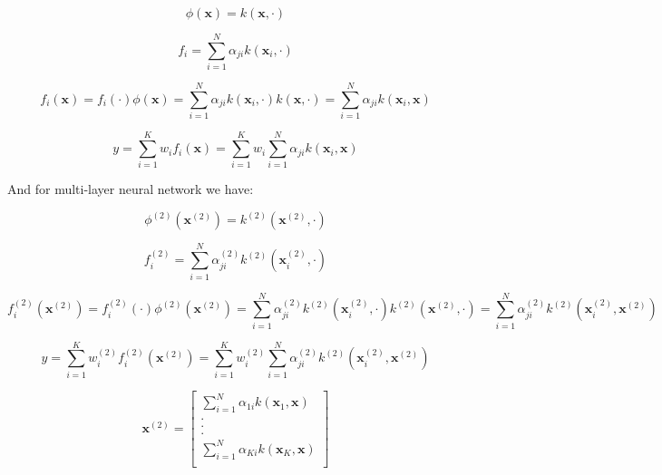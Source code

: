\documentclass{article}
\begin{document}
\begin{equation}
\phi(\mathbf{x}) = k(\mathbf{x},\cdot)
\end{equation}

\begin{equation}
f_i = \sum\limits_{i=1}^N \alpha_{ji} k(\mathbf{x}_i,\cdot)
\end{equation}

\begin{equation}
f_i(\mathbf{x}) = f_i(\cdot)\phi(\mathbf{x}) = \sum\limits_{i=1}^N \alpha_{ji} k(\mathbf{x}_i,\cdot) k(\mathbf{x}, \cdot) = \sum\limits_{i=1}^N \alpha_{ji} k(\mathbf{x}_i,\mathbf{x})
\end{equation}

\begin{equation}
y = \sum\limits_{i=1}^K w_i f_i(\mathbf{x}) = \sum\limits_{i=1}^K w_i \sum\limits_{i=1}^N \alpha_{ji} k(\mathbf{x}_i,\mathbf{x})
\end{equation}

And for multi-layer neural network we have:

\begin{equation}
\phi^{(2)}(\mathbf{x}^{(2)}) = k^{(2)}(\mathbf{x}^{(2)},\cdot)
\end{equation}

\begin{equation}
f_i^{(2)} = \sum\limits_{i=1}^N \alpha_{ji}^{(2)} k^{(2)}(\mathbf{x}_i^{(2)},\cdot)
\end{equation}

\begin{equation}
f_i^{(2)}(\mathbf{x}^{(2)}) = f_i^{(2)}(\cdot)\phi^{(2)}(\mathbf{x}^{(2)}) = \sum\limits_{i=1}^N \alpha_{ji}^{(2)} k^{(2)}(\mathbf{x}_i^{(2)},\cdot) k^{(2)}(\mathbf{x}^{(2)}, \cdot) = \sum\limits_{i=1}^N \alpha_{ji}^{(2)} k^{(2)}(\mathbf{x}_i^{(2)},\mathbf{x}^{(2)})
\end{equation}

\begin{equation}
y = \sum\limits_{i=1}^K w_i^{(2)} f_i^{(2)}(\mathbf{x}^{(2)}) = \sum\limits_{i=1}^K w_i^{(2)} \sum\limits_{i=1}^N \alpha_{ji}^{(2)} k^{(2)}(\mathbf{x}_i^{(2)},\mathbf{x}^{(2)})
\end{equation}

\begin{equation}
\mathbf{x}^{(2)} = \left[ \begin{array}{c}
  \sum\limits_{i=1}^N \alpha_{1i} k(\mathbf{x}_1,\mathbf{x})\\
  .\\
  .\\
  .\\
  \sum\limits_{i=1}^N \alpha_{Ki} k(\mathbf{x}_K,\mathbf{x})\\
\end{array}
  \right]
\end{equation}

%
%
\end{document}
